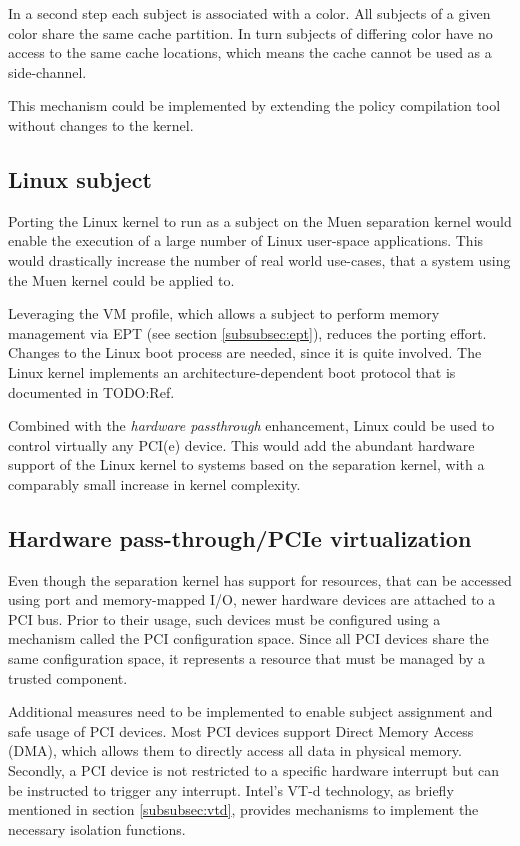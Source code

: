 In a second step each subject is associated with a color. All subjects of a
given color share the same cache partition. In turn subjects of differing color
have no access to the same cache locations, which means the cache cannot be used
as a side-channel.

This mechanism could be implemented by extending the policy compilation tool
without changes to the kernel.

\subsection{Linux subject}
Porting the Linux kernel to run as a subject on the Muen separation kernel would
enable the execution of a large number of Linux user-space applications. This
would drastically increase the number of real world use-cases, that a system
using the Muen kernel could be applied to.

Leveraging the VM profile, which allows a subject to perform memory management
via EPT (see section \ref{subsubsec:ept}), reduces the porting effort. Changes
to the Linux boot process are needed, since it is quite involved. The Linux
kernel implements an architecture-dependent boot protocol that is documented in
TODO:Ref.

Combined with the \emph{hardware passthrough} enhancement, Linux could be used
to control virtually any PCI(e) device. This would add the abundant hardware
support of the Linux kernel to systems based on the separation kernel, with a
comparably small increase in kernel complexity.

\subsection{Hardware pass-through/PCIe virtualization}
Even though the separation kernel has support for resources, that can be
accessed using port and memory-mapped I/O, newer hardware devices are attached
to a PCI bus. Prior to their usage, such devices must be configured using a
mechanism called the PCI configuration space. Since all PCI devices share the
same configuration space, it represents a resource that must be managed by a
trusted component.

Additional measures need to be implemented to enable subject assignment and safe
usage of PCI devices. Most PCI devices support Direct Memory Access (DMA), which
allows them to directly access all data in physical memory. Secondly, a PCI
device is not restricted to a specific hardware interrupt but can be instructed
to trigger any interrupt. Intel's VT-d technology, as briefly mentioned in
section \ref{subsubsec:vtd}, provides mechanisms to implement the necessary
isolation functions.

